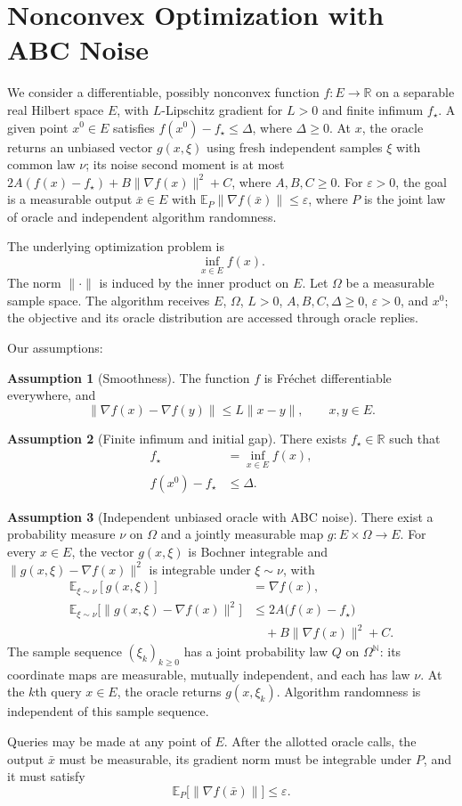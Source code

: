 \documentclass[10pt]{article}
\theoremstyle{definition}
\newtheorem{assumption}{Assumption}
\begin{document}
\section*{Nonconvex Optimization with ABC Noise}
We consider a differentiable, possibly nonconvex function $f:E\to\mathbb{R}$ on a separable real Hilbert space $E$, with $L$-Lipschitz gradient for $L>0$ and finite infimum $f_\star$. A given point $x^0\in E$ satisfies $f(x^0)-f_\star\leq\Delta$, where $\Delta\geq0$. At $x$, the oracle returns an unbiased vector $g(x,\xi)$ using fresh independent samples $\xi$ with common law $\nu$; its noise second moment is at most $2A(f(x)-f_\star)+B\|\nabla f(x)\|^2+C$, where $A,B,C\geq0$. For $\varepsilon>0$, the goal is a measurable output $\bar{x}\in E$ with $\mathbb{E}_P\|\nabla f(\bar{x})\|\leq\varepsilon$, where $P$ is the joint law of oracle and independent algorithm randomness.

The underlying optimization problem is
\[
\inf_{x\in E} f(x).
\]
The norm $\|\cdot\|$ is induced by the inner product on $E$. Let $\Omega$ be a measurable sample space. The algorithm receives $E$, $\Omega$, $L>0$, $A,B,C,\Delta\geq0$, $\varepsilon>0$, and $x^0$; the objective and its oracle distribution are accessed through oracle replies.

Our assumptions:
\begin{assumption}[Smoothness]
The function $f$ is Fr\'echet differentiable everywhere, and
\[
\|\nabla f(x)-\nabla f(y)\|\leq L\|x-y\|,
\qquad x,y\in E.
\]
\end{assumption}

\begin{assumption}[Finite infimum and initial gap]
There exists $f_\star\in\mathbb{R}$ such that
\[
\begin{aligned}
f_\star&=\inf_{x\in E} f(x),\\
f(x^0)-f_\star&\leq\Delta.
\end{aligned}
\]
\end{assumption}

\begin{assumption}[Independent unbiased oracle with ABC noise]
There exist a probability measure $\nu$ on $\Omega$ and a jointly measurable map $g:E\times\Omega\to E$. For every $x\in E$, the vector $g(x,\xi)$ is Bochner integrable and $\|g(x,\xi)-\nabla f(x)\|^2$ is integrable under $\xi\sim\nu$, with
\[
\begin{aligned}
\mathbb{E}_{\xi\sim\nu}[g(x,\xi)]&=\nabla f(x),\\
\mathbb{E}_{\xi\sim\nu}\bigl[\|g(x,\xi)-\nabla f(x)\|^2\bigr]
&\leq 2A\bigl(f(x)-f_\star\bigr)\\
&\quad+B\|\nabla f(x)\|^2+C.
\end{aligned}
\]
The sample sequence $(\xi_k)_{k\geq0}$ has a joint probability law $Q$ on $\Omega^{\mathbb{N}}$: its coordinate maps are measurable, mutually independent, and each has law $\nu$. At the $k$th query $x\in E$, the oracle returns $g(x,\xi_k)$. Algorithm randomness is independent of this sample sequence.
\end{assumption}

Queries may be made at any point of $E$. After the allotted oracle calls, the output $\bar{x}$ must be measurable, its gradient norm must be integrable under $P$, and it must satisfy
\[
\mathbb{E}_P\bigl[\|\nabla f(\bar{x})\|\bigr]\leq\varepsilon.
\]
\end{document}
